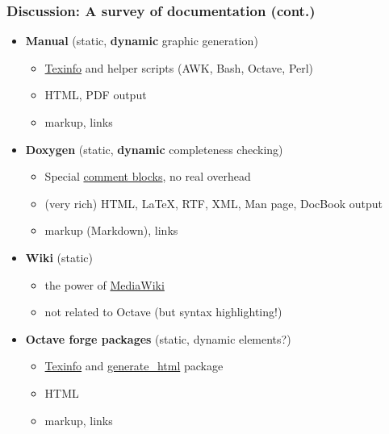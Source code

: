 \documentclass[xcolor=svgnames]{beamer}
\begin{document}
\begin{frame}[noframenumbering]
\frametitle{Discussion: A survey of documentation (cont.)}

\begin{itemize}
\item \textbf{Manual} (static, \textbf{dynamic} graphic generation)
  \begin{itemize}
  \item \href{https://www.gnu.org/software/texinfo/manual/texinfo/texinfo.html}{Texinfo}
    and helper scripts (AWK, Bash, Octave, Perl)
  \item HTML, PDF output
  \item markup, links
  \end{itemize}
\item \textbf{Doxygen} (static, \textbf{dynamic} completeness checking)
  \begin{itemize}
  \item Special
    \href{http://www.stack.nl/~dimitri/doxygen/manual/index.html}{comment blocks},
    no real overhead
  \item (very rich) HTML, LaTeX, RTF, XML, Man page, DocBook output
  \item markup (Markdown), links
  \end{itemize}
\item \textbf{Wiki} (static)
  \begin{itemize}
  \item the power of
    \href{https://www.mediawiki.org/wiki/Help:Formatting}{MediaWiki}
  \item not related to Octave (but syntax highlighting!)
  \end{itemize}
\item \textbf{Octave forge packages} (static, dynamic elements?)
  \begin{itemize}
  \item \href{https://www.gnu.org/software/texinfo/manual/texinfo/texinfo.html}{Texinfo}
  and \href{https://octave.sourceforge.io/generate_html}{generate\_html} package
  \item HTML
  \item markup, links
  \end{itemize}
\end{itemize}
\end{frame}
\end{document}
